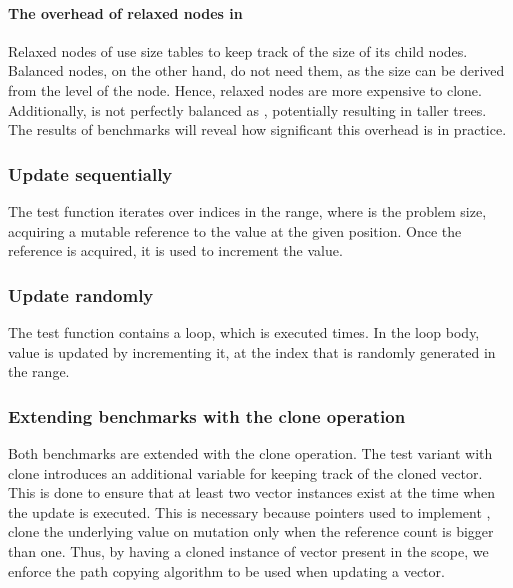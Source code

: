 \paragraph*{The overhead of relaxed nodes in \rrbtree{}}
Relaxed nodes of \rrbtree{} use size tables to keep track of the size of its child nodes. Balanced nodes, on the other hand, do not need them, as the size can be derived from the level of the node. Hence, relaxed nodes are more expensive to clone. Additionally, \rrbtree{} is not perfectly balanced as \rbtree{}, potentially resulting in taller trees. The results of benchmarks will reveal how significant this overhead is in practice. 

\subsubsection*{Update sequentially}
The test function iterates over indices in the \range{[0, N)} range, where \n{} is the problem size, acquiring a mutable reference to the value at the given position. Once the reference is acquired, it is used to increment the value. 

\subsubsection*{Update randomly}
The test function contains a loop, which is executed \n{} times. In the loop body, value is updated by incrementing it, at the index that is randomly generated in the \range{[0, N)} range. 

\subsubsection*{Extending benchmarks with the clone operation}
Both benchmarks are extended with the clone operation. The test variant with clone introduces an additional variable for keeping track of the cloned vector. This is done to ensure that at least two vector instances exist at the time when the update is executed. This is necessary because \rc{} pointers used to implement \rbtree{}, clone the underlying value on mutation only when the reference count is bigger than one. Thus, by having a cloned instance of vector present in the scope, we enforce the path copying algorithm to be used when updating a vector. 

